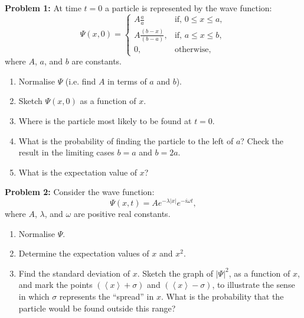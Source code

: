 \documentclass{article}
\begin{document}
\noindent\makebox[\linewidth]{\rule{\textwidth}{0.4pt}}
\textbf{Problem 1:} At time $t=0$ a particle is represented by the wave function:
\begin{equation}
\Psi(x,0) = \begin{cases}
A \frac{a}{a} & \text{if, } 0 \leq x \leq a, \\
A \frac{(b-x)}{(b-a)}, & \text{if, } a \leq x \leq b,  \\
0, & \text{otherwise},
\end{cases}
\end{equation}
where $A$, $a$, and $b$ are constants.
\begin{enumerate}[label=(\alph*), labelindent=\parindent,leftmargin=*]
\item Normalise $\Psi$ (i.e. find $A$ in terms of $a$ and $b$).
\item Sketch $\Psi(x,0)$ as a function of $x$.
\item Where is the particle most likely to be found at $t=0$.
\item What is the probability of finding the particle to the left of $a$? Check the result in the limiting cases $b=a$ and $b=2a$.
\item What is the expectation value of $x$?
\end{enumerate}
\noindent\makebox[\linewidth]{\rule{\textwidth}{0.4pt}}
\textbf{Problem 2:} Consider the wave function:
\begin{equation}
\Psi(x,t) = Ae^{-\lambda|x|}e^{-i\omega t},
\end{equation}
where $A$, $\lambda$, and $\omega$ are positive real constants.
\begin{enumerate}[label=(\alph*), labelindent=\parindent,leftmargin=*]
\item Normalise $\Psi$.
\item Determine the expectation values of $x$ and $x^{2}$.
\item Find the standard deviation of $x$. Sketch the graph of $| \Psi |^{2}$, as a function of $x$, and mark the points $(\left< x \right> + \sigma)$ and $(\left< x \right> - \sigma)$, to illustrate the sense in which $\sigma$ represents the ``spread'' in $x$. What is the probability that the particle would be found outside this range?
\end{enumerate}
\end{document}
